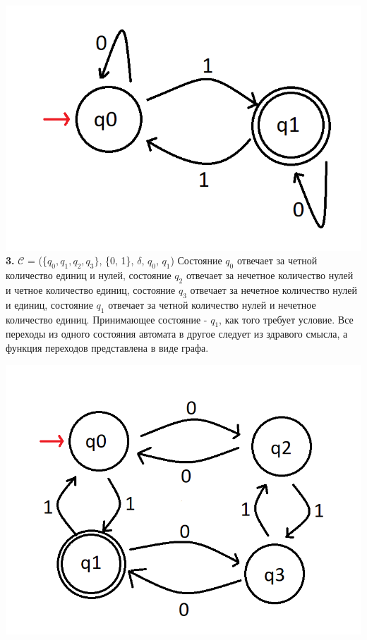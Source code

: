 \documentclass[a4paper,14pt]{article} %
\begin{document}
\includegraphics[scale=0.5]{04.png}
\newline
\textbf{3.}
$\mathcal{C}$ = (\{$q_0, q_1, q_2, q_3\}$, \{0, 1\}, $\delta$, $q_0$, $q_1$)
Состояние $q_0$ отвечает за четной количество единиц и нулей, состояние $q_2$ отвечает за нечетное количество нулей и четное количество единиц, состояние $q_3$ отвечает за нечетное количество нулей и единиц, состояние $q_1$ отвечает за четной количество нулей и нечетное количество единиц.
Принимающее состояние - $q_1$, как того требует условие. Все переходы из одного состояния автомата в другое следует из здравого смысла, а функция переходов представлена в виде графа.

\includegraphics[scale=0.5]{05.png}
\end{document}
